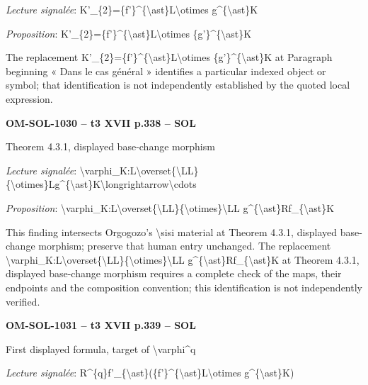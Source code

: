 \emph{Lecture signalée}: K'\_\{2\}=\allowbreak \{f'\}\textasciicircum{}\{\textbackslash{}ast\}L\textbackslash{}otimes g\textasciicircum{}\{\textbackslash{}ast\}K\par
\emph{Proposition}: K'\_\{2\}=\allowbreak \{f'\}\textasciicircum{}\{\textbackslash{}ast\}L\textbackslash{}otimes \{g'\}\textasciicircum{}\{\textbackslash{}ast\}K\par
The replacement K'\_\{2\}=\allowbreak \{f'\}\textasciicircum{}\{\textbackslash{}ast\}L\textbackslash{}otimes \{g'\}\textasciicircum{}\{\textbackslash{}ast\}K at Paragraph beginning « Dans le cas général » identifies a particular indexed object or symbol; that identification is not independently established by the quoted local expression.\par
\par\noindent\textbf{OM-SOL-1030 -- t3 XVII p.338 -- SOL}\par
Theorem 4.3.1, displayed base-change morphism\par
\emph{Lecture signalée}: \textbackslash{}varphi\_K:L\textbackslash{}overset\{\textbackslash{}LL\}\{\textbackslash{}otimes\}Lg\textasciicircum{}\{\textbackslash{}ast\}K\textbackslash{}longrightarrow\textbackslash{}cdots\par
\emph{Proposition}: \textbackslash{}varphi\_K:L\textbackslash{}overset\{\textbackslash{}LL\}\{\textbackslash{}otimes\}\textbackslash{}LL g\textasciicircum{}\{\textbackslash{}ast\}Rf\_\{\textbackslash{}ast\}K\par
This finding intersects Orgogozo's \textbackslash{}sisi material at Theorem 4.3.1, displayed base-change morphism; preserve that human entry unchanged. The replacement \textbackslash{}varphi\_K:L\textbackslash{}overset\{\textbackslash{}LL\}\{\textbackslash{}otimes\}\textbackslash{}LL g\textasciicircum{}\{\textbackslash{}ast\}Rf\_\{\textbackslash{}ast\}K at Theorem 4.3.1, displayed base-change morphism requires a complete check of the maps, their endpoints and the composition convention; this identification is not independently verified.\par
\par\noindent\textbf{OM-SOL-1031 -- t3 XVII p.339 -- SOL}\par
First displayed formula, target of \textbackslash{}varphi\textasciicircum{}q\par
\emph{Lecture signalée}: R\textasciicircum{}\{q\}f'\_\{\textbackslash{}ast\}(\{f'\}\textasciicircum{}\{\textbackslash{}ast\}L\textbackslash{}otimes g\textasciicircum{}\{\textbackslash{}ast\}K)\par
